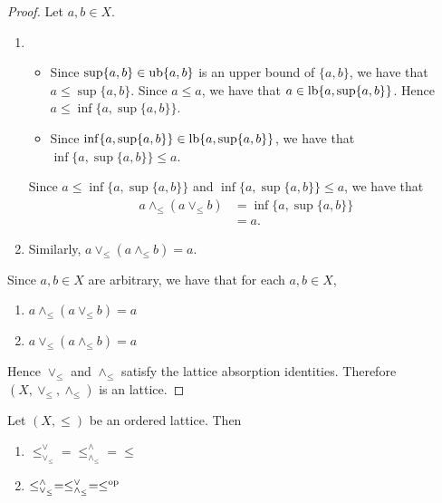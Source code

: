 \documentclass{book}
\begin{document}
	\begin{proof} Let $a,b \in X$. 
		\begin{enumerate}
			\item 
			\begin{itemize}
				\item Since $\sup \{a,b\} \in \operatorname{ub} \{a,b\}$ is an upper bound of $\{a,b\}$, we have that $a \leq \sup \{a,b\}$. Since $a \leq a$, we have that $a \in \operatorname{lb} \{a, \sup\{a, b \} \}$. Hence $a \leq \inf \{a, \sup\{a, b \} \}$. 
				\item Since $\inf \{a, \sup\{a,b\}\} \in \operatorname{lb} \{a, \sup \{a,b\}\}$, we have that $\inf \{a, \sup\{a,b\}\} \leq a$.
			\end{itemize}
			Since $a \leq \inf \{a, \sup\{a, b \} \}$ and $\inf \{a, \sup\{a,b\}\} \leq a$, we have that 
			\begin{align*}
				a \wedge_{\leq} (a \vee_{\leq} b)
				& = \inf \{a, \sup\{a, b \} \} \\
				& = a.
			\end{align*}
			\item Similarly, $a \vee_{\leq} (a \wedge_{\leq} b) = a$.
		\end{enumerate}
		Since $a, b \in X$ are arbitrary, we have that for each $a,b \in X$, 
		\begin{enumerate}
			\item $a \wedge_{\leq} (a \vee_{\leq} b) = a$
			\item $a \vee_{\leq} (a \wedge_{\leq} b) = a$
		\end{enumerate} 
		Hence $\vee_{\leq}$ and $\wedge_{\leq}$ satisfy the lattice absorption identities. Therefore $(X, \vee_{\leq}, \wedge_{\leq})$ is an lattice.
	\end{proof}
	
	\begin{ex} 
		Let $(X, \leq)$ be an ordered lattice. Then
		\begin{enumerate}
			\item $\leq_{\vee_{\leq}}^{\vee} = \leq_{\wedge_{\leq}}^{\wedge} = \leq$
			\item $\leq_{\vee_{\leq}}^{\wedge} = \leq_{\wedge_{\leq}}^{\vee} = \leq^{\text{op}}$
		\end{enumerate}
	\end{ex}
	
\end{document}
